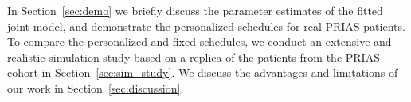 In Section~\ref{sec:demo} we briefly discuss the parameter estimates of the fitted joint model, and demonstrate the personalized schedules for real PRIAS patients. To compare the personalized and fixed schedules, we conduct an extensive and realistic simulation study based on a replica of the patients from the PRIAS cohort in Section~\ref{sec:sim_study}. We discuss the advantages and limitations of our work in Section~\ref{sec:discussion}.